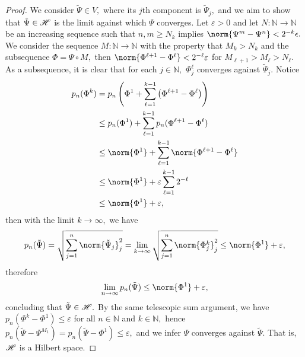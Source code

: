 \begin{proof}
    We consider \(\tilde{\Psi} \in V,\) where its \(j\)th component is \(\tilde{\Psi}_j,\) and we aim to show that \(\tilde{\Psi} \in \mathscr{H}\) is the limit against which \(\Psi\) converges. Let \(\varepsilon > 0\) and let \(N : \mathbb{N} \to \mathbb{N}\) be an increasing sequence such that \(n,m \geq N_k\) implies \(\norm{\Psi^m - \Psi^n} < 2^{-k}\epsilon.\) We consider the sequence \(M : \mathbb{N} \to \mathbb{N}\) with the property that \(M_k > N_k\) and the subsequence \(\Phi = \Psi \circ M,\) then \(\norm{\Phi^{\ell+1} - \Phi^\ell} < 2^{-\ell}\varepsilon\) for \(M_{\ell + 1} > M_\ell > N_\ell.\) As a subsequence, it is clear that for each \(j \in \mathbb{N},\) \(\Phi_j^\ell\) converges against \(\tilde{\Psi}_j.\) Notice
    \begin{align*}
        p_n(\Phi^k) &= p_n\left(\Phi^1 + \sum_{\ell = 1}^{k-1}{\left(\Phi^{\ell+1} - \Phi^\ell\right)}\right)\\
                    &\leq p_n(\Phi^1) + \sum_{\ell = 1}^{k-1}{p_n(\Phi^{\ell+1} - \Phi^\ell)}\\
                    &\leq \norm{\Phi^1} + \sum_{\ell = 1}^{k-1}{\norm{\Phi^{\ell+1} - \Phi^\ell}}\\
                    &\leq \norm{\Phi^1} + \varepsilon \sum_{\ell = 1}^{k-1}{2^{-\ell}}\\
                    &\leq \norm{\Phi^1} + \varepsilon,
    \end{align*}
    then with the limit \(k \to \infty,\) we have
    \begin{equation*}
        p_n(\tilde{\Psi}) = \sqrt{\sum_{j = 1}^n{\norm{\tilde{\Psi}_j}_j^2}} = \lim_{k\to\infty}{\sqrt{\sum_{j = 1}^n{\norm{\Phi^k_j}_j^2}}} \leq \norm{\Phi^1} + \varepsilon,
    \end{equation*}
    therefore
    \begin{equation*}
        \lim_{n \to \infty}{p_n(\tilde{\Psi})} \leq \norm{\Phi^1} + \varepsilon,
    \end{equation*}
    concluding that \(\tilde{\Psi} \in \mathscr{H}.\) By the same telescopic sum argument, we have \(p_n(\Phi^k - \Phi^1) \leq \varepsilon\) for all \(n \in \mathbb{N}\) and \(k \in \mathbb{N},\) hence \(p_n(\tilde{\Psi} - \Psi^{M_1}) = p_n(\tilde{\Psi} - \Phi^1) \leq \varepsilon,\) and we infer \(\Psi\) converges against \(\tilde{\Psi}.\) That is, \(\mathscr{H}\) is a Hilbert space.
\end{proof}

